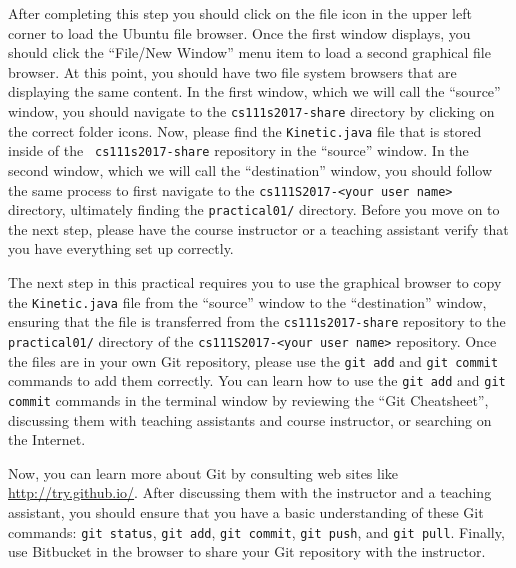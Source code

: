 After completing this step you should click on the file icon in the upper left corner to load the Ubuntu file browser.
Once the first window displays, you should click the ``File/New Window'' menu item to load a second graphical file
browser. At this point, you should have two file system browsers that are displaying the same content.  In the first
window, which we will call the ``source'' window, you should navigate to the {\tt cs111s2017-share} directory by
clicking on the correct folder icons.  Now, please find the {\tt Kinetic.java} file that is stored inside of the {\tt
cs111s2017-share} repository in the ``source'' window. In the second window, which we will call the ``destination''
window, you should follow the same process to first navigate to the {\tt cs111S2017-<your user name>} directory,
ultimately finding the {\tt practical01/} directory. Before you move on to the next step, please have the course
instructor or a teaching assistant verify that you have everything set up correctly.

The next step in this practical requires you to use the graphical browser to copy the {\tt Kinetic.java} file from the
``source'' window to the ``destination'' window, ensuring that the file is transferred from the {\tt cs111s2017-share}
repository to the {\tt practical01/} directory of the {\tt cs111S2017-<your user name>} repository.  Once the files are
in your own Git repository, please use the {\tt git add} and {\tt git commit} commands to add them correctly. You can
learn how to use the {\tt git add} and {\tt git commit} commands in the terminal window by reviewing the ``Git
Cheatsheet'', discussing them with teaching assistants and course instructor, or searching on the Internet.


Now, you can learn more about Git by consulting web sites like \url{http://try.github.io/}. After discussing them with
the instructor and a teaching assistant, you should ensure that you have a basic understanding of these Git commands:
{\tt git status}, {\tt git add}, {\tt git commit}, {\tt git push}, and {\tt git pull}. Finally, use Bitbucket in the
browser to share your Git repository with the instructor.

